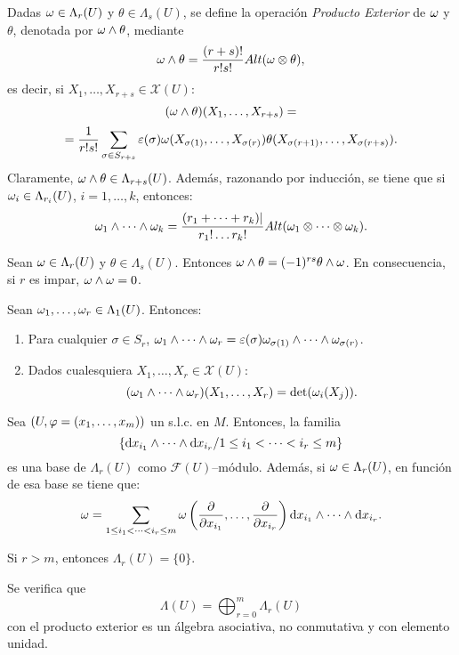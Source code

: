 \documentclass[cursovd_portada.tex]{subfiles}
\begin{document}
Dadas $\omega\in\Lambda_r(U)$ y $\theta\in\Lambda_s(U)$, se define la operación {\it Producto Exterior} de $\omega$ y
$\theta$, denotada por $\omega\wedge\theta$, mediante
$$\omega\wedge\theta=\frac{(r+s)!}{r!s!}Alt(\omega\otimes\theta),$$
es decir, si $X_1,\dots ,X_{r+s}\in\mathcal{X}(U)$:
$$(\omega\wedge\theta)(X_1,\dots ,X_{r+s})=$$
$$=\frac{1}{r!s!}\sum_{\sigma\in S_{r+s}}\varepsilon(\sigma)\omega(X_{\sigma(1)},\dots
,X_{\sigma(r)})\theta(X_{\sigma(r+1)},\dots ,X_{\sigma(r+s)}).$$ \hs Claramente,
$\omega\wedge\theta\in\Lambda_{r+s}(U)$. Además, razonando por inducción, se tiene que si $\omega_i\in\Lambda_{r_i}(U)$,
$i=1,\dots ,k$, entonces:
$$\omega_1\wedge\cdots\wedge\omega_k=\frac{(r_1+\cdots +r_k)|}{r_1!\dots r_k!}Alt(\omega_1\otimes\cdots\otimes\omega_k).$$
\begin{prop}
Sean $\omega\in\Lambda_r(U)$ y $\theta\in\Lambda_s(U)$. Entonces $\omega\wedge\theta=(-1)^{rs}\theta\wedge\omega$. En
consecuencia, si $r$ es impar, $\omega\wedge\omega=0$.
\end{prop}
\begin{prop}
Sean $\omega_1,\dots ,\omega_r\in\Lambda_1(U)$. Entonces:
\begin{enumerate}
\item Para cualquier $\sigma\in S_r$, $\omega_1\wedge\cdots\wedge\omega_r=\varepsilon(\sigma)\omega_{\sigma(1)}\wedge\cdots
\wedge\omega_{\sigma(r)}$.
\item Dados cualesquiera $X_1,\dots ,X_r\in\mathcal{X}(U)$:
$$(\omega_1\wedge\cdots\wedge\omega_r)(X_1,\dots ,X_r)={\rm det}(\omega_i(X_j)).$$
\end{enumerate}
\end{prop}
\begin{prop}
Sea $(U,\varphi=(x_1,\dots ,x_m))$ un s.l.c. en $M$. Entonces, la familia
$$\{{\rm d} x_{i_1}\wedge\cdots\wedge{\rm d} x_{i_r}/1\leq i_1<\cdots <i_r\leq m\}$$
es una base de $\Lambda_r(U)$ como $\mathcal{F}(U)$--módulo. Además, si $\omega\in\Lambda_r(U)$, en función de esa
base se tiene que:
$$\omega=\sum_{1\leq i_1 <\cdots <i_r\leq m}\omega\left(\displaystyle{\frac{\partial}{\partial x_{i_1}}},\dots
,\displaystyle{\frac{\partial}{\partial x_{i_r}}}\right){\rm d} x_{i_1}\wedge\cdots\wedge{\rm d} x_{i_r}.$$
\end{prop}
\begin{coro}
Si $r>m$, entonces $\Lambda_r(U)=\{0\}$.
\end{coro}
\begin{prop}
Se verifica que
$$\Lambda(U)=\bigoplus_{r=0}^m\Lambda_r(U)$$
con el producto exterior es un álgebra asociativa, no conmutativa y con elemento unidad.
\end{prop}
\end{document}
